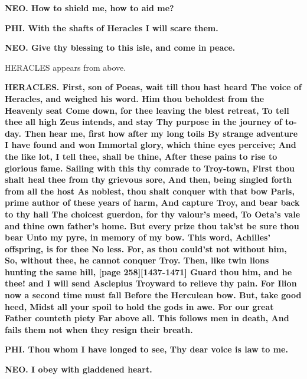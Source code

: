 \documentclass[11pt,letter]{book}
\begin{document}
\par \textbf{NEO. How to shield me, how to aid me?}
\par 

\par \textbf{PHI. With the shafts of Heracles I will scare them.}
\par 

\par \textbf{NEO. Give thy blessing to this isle, and come in peace.}
\par 

\par  HERACLES appears from above.

\par \textbf{HERACLES. First, son of Poeas, wait till thou hast heard The voice of Heracles, and weighed his word. Him thou beholdest from the Heavenly seat Come down, for thee leaving the blest retreat, To tell thee all high Zeus intends, and stay Thy purpose in the journey of to-day. Then hear me, first how after my long toils By strange adventure I have found and won Immortal glory, which thine eyes perceive; And the like lot, I tell thee, shall be thine, After these pains to rise to glorious fame. Sailing with this thy comrade to Troy-town, First thou shalt heal thee from thy grievous sore, And then, being singled forth from all the host As noblest, thou shalt conquer with that bow Paris, prime author of these years of harm, And capture Troy, and bear back to thy hall The choicest guerdon, for thy valour’s meed, To Oeta’s vale and thine own father’s home. But every prize thou tak’st be sure thou bear Unto my pyre, in memory of my bow. This word, Achilles’ offspring, is for thee No less. For, as thou could’st not without him, So, without thee, he cannot conquer Troy. Then, like twin lions hunting the same hill, [page 258][1437-1471] Guard thou him, and he thee! and I will send Asclepius Troyward to relieve thy pain. For Ilion now a second time must fall Before the Herculean bow. But, take good heed, Midst all your spoil to hold the gods in awe. For our great Father counteth piety Far above all. This follows men in death, And fails them not when they resign their breath.}
\par 

\par \textbf{PHI. Thou whom I have longed to see, Thy dear voice is law to me.}
\par 

\par \textbf{NEO. I obey with gladdened heart.}
\par 
\end{document}
